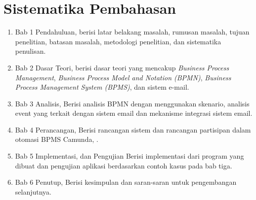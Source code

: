 \section{Sistematika Pembahasan}
\label{sec:sispem}

\begin{enumerate}
	\item Bab 1 Pendahuluan, berisi latar belakang masalah, rumusan masalah, tujuan penelitian, batasan masalah, metodologi penelitian, dan sistematika penulisan.
	\item Bab 2 Dasar Teori, berisi dasar teori yang mencakup \textit{Business Process Management}, \textit{Business Process Model and Notation (BPMN)}, \textit{Business Process Management System (BPMS)}, dan sistem e-mail.
	\item Bab 3 Analisis, Berisi analisis BPMN dengan menggunakan skenario, analisis event yang terkait dengan sistem email  dan mekanisme integrasi sistem email.
	\item Bab 4 Perancangan, Berisi rancangan sistem dan rancangan partisipan dalam otomasi BPMS Camunda, .
	\item Bab 5 Implementasi, dan Pengujian Berisi implementasi dari program yang dibuat dan pengujian aplikasi berdasarkan contoh kasus pada bab tiga.
	\item Bab 6 Penutup, Berisi kesimpulan dan saran-saran untuk pengembangan selanjutnya.
\end{enumerate}


